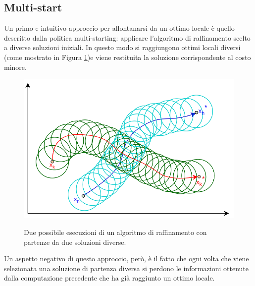 \subsection{Multi-start}
Un primo e intuitivo approccio per allontanarsi da un ottimo locale è quello descritto  dalla politica multi-starting: applicare l'algoritmo di raffinamento scelto a diverse soluzioni iniziali. In questo modo si raggiungono ottimi locali diversi (come mostrato in Figura \ref{multi_starting})e viene restituita la soluzione corrispondente al costo minore. 
\begin{figure}[H] 
\begin{center} 
  \includegraphics[scale=0.5]{Images/multistart}\\ 
  \caption{\footnotesize{Due possibile esecuzioni di un algoritmo di raffinamento con partenze da due soluzioni diverse.}}
  \label{multi_starting}
\end{center}
\end{figure}
Un aspetto negativo di questo approccio, però, è il fatto che ogni volta che viene selezionata una soluzione di partenza diversa si perdono le informazioni ottenute dalla computazione precedente che ha già raggiunto un ottimo locale.
